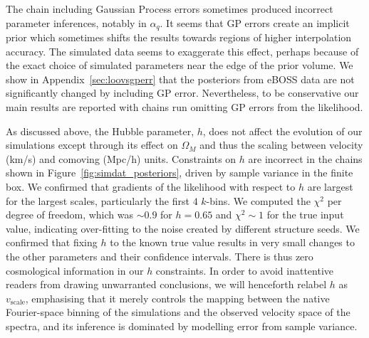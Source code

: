The chain including Gaussian Process errors sometimes produced incorrect parameter inferences, notably in $\alpha_q$. It seems that GP errors create an implicit prior which sometimes shifts the results towards regions of higher interpolation accuracy. The simulated data seems to exaggerate this effect, perhaps because of the exact choice of simulated parameters near the edge of the prior volume. We show in Appendix~\ref{sec:loovsgperr} that the posteriors from eBOSS data are not significantly changed by including GP error. Nevertheless, to be conservative our main results are reported with chains run omitting GP errors from the likelihood.

As discussed above, the Hubble parameter, $h$, does not affect the evolution of our simulations except through its effect on $\Omega_M$ and thus the scaling between velocity (km/s) and comoving (Mpc/h) units. Constraints on $h$ are incorrect in the chains shown in Figure~\ref{fig:simdat_posteriors}, driven by sample variance in the finite box. We confirmed that gradients of the likelihood with respect to $h$ are largest for the largest scales, particularly the first $4$ $k$-bins. We computed the $\chi^2$ per degree of freedom, which was $\sim 0.9$ for $h = 0.65$ and $\chi^2 \sim 1$ for the true input value, indicating over-fitting to the noise created by different structure seeds. We confirmed that fixing $h$ to the known true value results in very small changes to the other parameters and their confidence intervals. There is thus zero cosmological information in our $h$ constraints. In order to avoid inattentive readers from drawing unwarranted conclusions, we will henceforth relabel $h$ as $v_\mathrm{scale}$, emphasising that it merely controls the mapping between the native Fourier-space binning of the simulations and the observed velocity space of the spectra, and its inference is dominated by modelling error from sample variance.